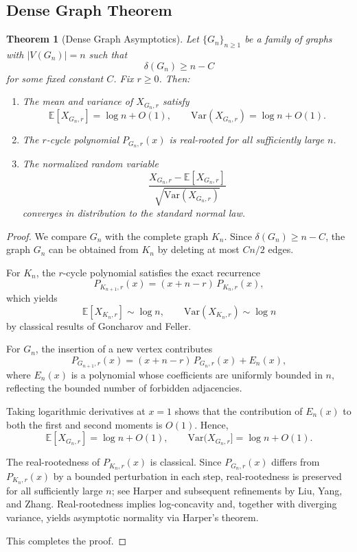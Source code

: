 \documentclass{amsart}
\newtheorem{theorem}{Theorem}[section]
\theoremstyle{definition}
\begin{document}
\subsection{Dense Graph Theorem}

\begin{theorem}[Dense Graph Asymptotics]
\label{thm:dense}
Let $\{G_n\}_{n\ge1}$ be a family of graphs with $|V(G_n)|=n$ such that
\[
\delta(G_n) \ge n - C
\]
for some fixed constant $C$. Fix $r\ge0$. Then:

\begin{enumerate}
\item The mean and variance of $X_{G_n,r}$ satisfy
\[
\mathbb{E}[X_{G_n,r}] = \log n + O(1),
\qquad
\mathrm{Var}(X_{G_n,r}) = \log n + O(1).
\]

\item The $r$-cycle polynomial $P_{G_n,r}(x)$ is real-rooted for all sufficiently
large $n$.

\item The normalized random variable
\[
\frac{X_{G_n,r}-\mathbb{E}[X_{G_n,r}]}
{\sqrt{\mathrm{Var}(X_{G_n,r})}}
\]
converges in distribution to the standard normal law.
\end{enumerate}
\end{theorem}

\begin{proof}
We compare $G_n$ with the complete graph $K_n$. Since
$\delta(G_n)\ge n-C$, the graph $G_n$ can be obtained from $K_n$ by deleting at
most $Cn/2$ edges.

For $K_n$, the $r$-cycle polynomial satisfies the exact recurrence
\[
P_{K_{n+1},r}(x) = (x+n-r)\,P_{K_n,r}(x),
\]
which yields
\[
\mathbb{E}[X_{K_n,r}] \sim \log n,
\qquad
\mathrm{Var}(X_{K_n,r}) \sim \log n
\]
by classical results of Goncharov and Feller.

For $G_n$, the insertion of a new vertex contributes
\[
P_{G_{n+1},r}(x)
=
(x+n-r)\,P_{G_n,r}(x) + E_n(x),
\]
where $E_n(x)$ is a polynomial whose coefficients are uniformly
bounded in $n$, reflecting the bounded number of forbidden adjacencies.

Taking logarithmic derivatives at $x=1$ shows that the contribution of $E_n(x)$
to both the first and second moments is $O(1)$. Hence,
\[
\mathbb{E}[X_{G_n,r}] = \log n + O(1),
\qquad
\mathrm{Var}(X_{G_n,r}] = \log n + O(1).
\]

The real-rootedness of $P_{K_n,r}(x)$ is classical. Since $P_{G_n,r}(x)$ differs
from $P_{K_n,r}(x)$ by a bounded perturbation in each step, real-rootedness is
preserved for all sufficiently large $n$; see Harper and subsequent refinements
by Liu, Yang, and Zhang. Real-rootedness implies log-concavity and, together with
diverging variance, yields asymptotic normality via Harper’s theorem.

This completes the proof.
\end{proof}
\end{document}
